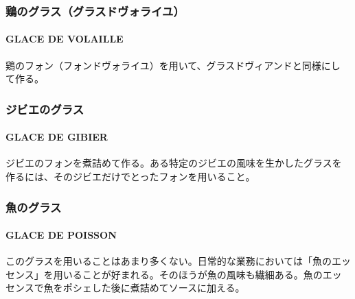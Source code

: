 \begin{recette}
\maeaki

\hypertarget{ux9d8fux306eux30b0ux30e9ux30b9ux30b0ux30e9ux30b9ux30c9ux30f4ux30a9ux30e9ux30a4ux30e6}{%
\subsubsection{鶏のグラス（グラスドヴォライユ）}\label{ux9d8fux306eux30b0ux30e9ux30b9ux30b0ux30e9ux30b9ux30c9ux30f4ux30a9ux30e9ux30a4ux30e6}}

\hypertarget{glace-de-volaille}{%
\paragraph{GLACE DE VOLAILLE}\label{glace-de-volaille}}


鶏のフォン（フォンドヴォライユ）を用いて、グラスドヴィアンドと同様にし
て作る。

\maeaki

\hypertarget{ux30b8ux30d3ux30a8ux306eux30b0ux30e9ux30b9}{%
\subsubsection{ジビエのグラス}\label{ux30b8ux30d3ux30a8ux306eux30b0ux30e9ux30b9}}

\hypertarget{glace-de-gibier}{%
\paragraph{GLACE DE GIBIER}\label{glace-de-gibier}}


ジビエのフォンを煮詰めて作る。ある特定のジビエの風味を生かしたグラスを
作るには、そのジビエだけでとったフォンを用いること。

\maeaki

\hypertarget{ux9b5aux306eux30b0ux30e9ux30b9}{%
\subsubsection{魚のグラス}\label{ux9b5aux306eux30b0ux30e9ux30b9}}

\hypertarget{glace-de-poisson}{%
\paragraph{GLACE DE POISSON}\label{glace-de-poisson}}


このグラスを用いることはあまり多くない。日常的な業務においては「魚のエッ
センス」を用いることが好まれる。そのほうが魚の風味も繊細ある。魚のエッ
センスで魚をポシェした後に煮詰めてソースに加える。
\end{recette}
\newpage


